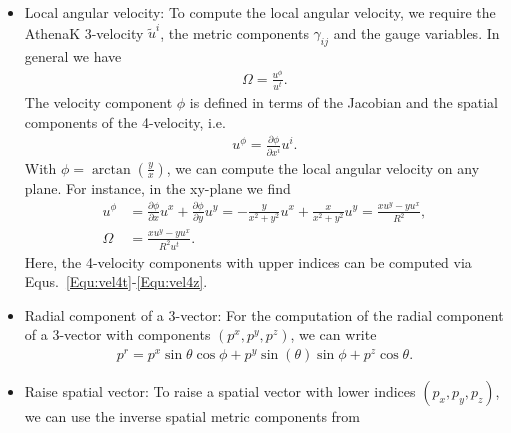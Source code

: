 \documentclass{article}
\newcommand{\var}[1]{%
  {\setlength{\fboxsep}{1.5pt}%
   \colorbox{varbg}{\textcolor{varfg}{\texttt{\small #1}}}}}
\newcommand{\gxx}{\var{adm\_gxx}}
\newcommand{\gxy}{\var{adm\_gxy}}
\newcommand{\gxz}{\var{adm\_gxz}}
\newcommand{\gyy}{\var{adm\_gyy}}
\newcommand{\gyz}{\var{adm\_gyz}}
\newcommand{\gzz}{\var{adm\_gzz}}
\newcommand{\alp}{\var{z4c\_alpha}}
\newcommand{\betx}{\var{z4c\_betax}}
\newcommand{\bety}{\var{z4c\_betay}}
\newcommand{\betz}{\var{z4c\_betaz}}
\begin{document}
\begin{itemize}
  upper indices, Equ.~\eqref{Equ:betamag} to compute the amplitude of the shift vector and Equs.~\eqref{Equ:betx_d}-\eqref{Equ:betz_d} to compute the shift vector with lower indices,
  we can use the AthenaK variables to get the lower indices of the magnetic field components in the fluid frame via
  \begin{align}
    b_t=&(-\alp^2+\beta^2)b^t+\beta_xb^x+\beta_yb^y+\beta_zb^z,\label{Equ:bt_d}\\
    b_x=&\gxx(b^t\betx+b^x)+\gxy(b^t\bety+b^y)+\gxz(b^t\betz+b^z),\label{Equ:bx_d}\\
    b_y=&\gxy(b^t\betx+b^x)+\gyy(b^t\bety+b^y)+\gyz(b^t\betz+b^z),\label{Equ:by_d}\\
    b_z=&\gxz(b^t\betx+b^x)+\gyz(b^t\bety+b^y)+\gzz(b^t\betz+b^z).\label{Equ:bz_d}
  \end{align}
  \item Local angular velocity: To compute the local angular velocity, we require the AthenaK 3-velocity $\tilde{u}^i$,
  the metric components $\gamma_{ij}$ and the gauge variables. In general we have
  \begin{align}\label{Equ:Omega}
    \Omega = \frac{u^{\phi}}{u^t}.
  \end{align}
  The velocity component $\phi$ is defined in terms of the Jacobian and the spatial components of the 4-velocity, i.e.
  \begin{align}
    u^{\phi}=\frac{\partial\phi}{\partial x^i}u^i.\nonumber
  \end{align}
  With $\phi=\arctan{\left(\frac{y}{x}\right)}$, we can compute the local angular velocity on any plane. For instance,
  in the xy-plane we find
  \begin{align}
    u^{\phi}&=\frac{\partial\phi}{\partial x}u^x+\frac{\partial \phi}{\partial y}u^y=-\frac{y}{x^2+y^2}u^x+\frac{x}{x^2+y^2}u^y=\frac{xu^y-yu^x}{R^2},\nonumber\\
    \Omega &= \frac{xu^y-yu^x}{R^2u^t}.\nonumber
  \end{align}
  Here, the 4-velocity components with upper indices can be computed via Equs.~\eqref{Equ:vel4t}-\eqref{Equ:vel4z}.
  \item Radial component of a 3-vector: For the computation of the radial component of a 3-vector with components $(p^x,p^y,p^z)$, we can write
  \begin{align}
    p^r = p^x\sin{\theta}\cos{\phi}+p^y\sin(\theta)\sin{\phi}+p^z\cos{\theta}.\label{Equ:radcomp}
  \end{align}
  \item Raise spatial vector: To raise a spatial vector with lower indices $(p_x,p_y,p_z)$, we can use the inverse spatial metric components from

\end{itemize}
\end{document}
